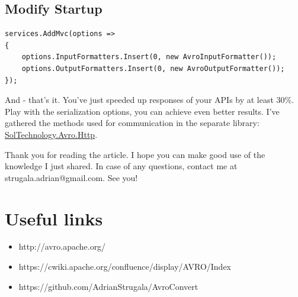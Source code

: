 \documentclass[]{article}
\begin{document}
\subsection{Modify Startup}
\begin{lstlisting}[language={[Sharp]C}, label={Script}]
services.AddMvc(options =>
{
	options.InputFormatters.Insert(0, new AvroInputFormatter());
	options.OutputFormatters.Insert(0, new AvroOutputFormatter());
});
\end{lstlisting}

And - that's it. You've just speeded up responses of your APIs by at least 30\%. Play with the serialization options, you can achieve even better results. I've gathered the methods used for communication in the separate library: \href{https://www.nuget.org/packages/SolTechnology.Avro.Http}{SolTechnology.Avro.Http}.

Thank you for reading the article. I hope you can make good use of the knowledge I just shared. In case of any questions, contact me at strugala.adrian@gmail.com. See you!

\section{Useful links}
\begin{itemize}
	\item http://avro.apache.org/
	\item https://cwiki.apache.org/confluence/display/AVRO/Index
	\item https://github.com/AdrianStrugala/AvroConvert
\end{itemize}
\end{document}
